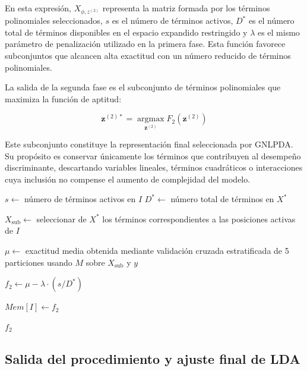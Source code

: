 En esta expresión, $X_{\phi,z^{(2)}}$ representa la matriz formada por los términos polinomiales seleccionados, $s$ es el número de términos activos, $D^*$ es el número total de términos disponibles en el espacio expandido restringido y $\lambda$ es el mismo parámetro de penalización utilizado en la primera fase. Esta función favorece subconjuntos que alcancen alta exactitud con un número reducido de términos polinomiales.

La salida de la segunda fase es el subconjunto de términos polinomiales que maximiza la función de aptitud:

\begin{equation}
	\mathbf{z}^{(2)*} = \operatorname*{argmax}_{\mathbf{z}^{(2)}} F_2(\mathbf{z}^{(2)})
	\label{eq:EM13}
\end{equation}

Este subconjunto constituye la representación final seleccionada por GNLPDA. Su propósito es conservar únicamente los términos que contribuyen al desempeño discriminante, descartando variables lineales, términos cuadráticos o interacciones cuya inclusión no compense el aumento de complejidad del modelo.

\begin{algorithm}[H]
	
	$s \gets$ número de términos activos en $I$\;
	$D^{*} \gets$ número total de términos en $X^{*}$\;
	
	
	
	$X_{\text{sub}} \gets$ seleccionar de $X^{*}$ los términos correspondientes a las posiciones activas de $I$\;
	
	$\mu \gets$ exactitud media obtenida mediante validación cruzada estratificada de 5 particiones usando $M$ sobre $X_{\text{sub}}$ y $y$\;
	
	$f_2 \gets \mu - \lambda \cdot (s/D^{*})$\;
	
	$Mem[I] \gets f_2$\;
	
	\Return $f_2$\;
	
	\caption{Evaluación de aptitud en espacio polinomial restringido}
\end{algorithm}

\subsection{Salida del procedimiento y ajuste final de LDA}

